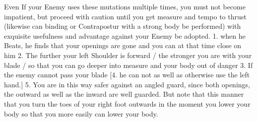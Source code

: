 
Even If your Enemy uses these mutations multiple times, you must not
become impatient, but proceed with caution until you get measure and
tempo to thrust (likewise can binding or Contrapostur with a strong
body be performed) with exquisite usefulness and advantage against
your Enemy be adopted. 1. when he Beats, he finds that your openings
are gone and you can at that time close on him 2. The further your
left Shoulder is forward / the stronger you are with your blade / so
that you can go deeper into measure and your body out of danger 3. If
the enemy cannot pass your blade [4. he can not as well as otherwise use the left hand.]
5. You are in this way safer against
an angled guard, since both openings, the outward as well as the
inward are well guarded. But note that this manner that you turn the
toes of your right foot outwards in the moment you lower your body so
that you more easily can lower your body.


